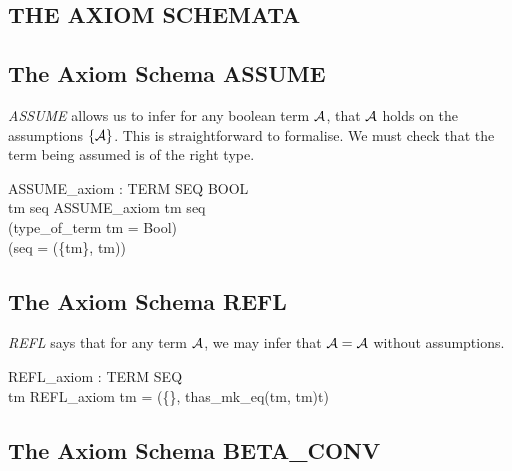 \documentclass[a4paper,11pt,titlepage]{article}
\begin{document}
\begin{titlepage}
\section{THE AXIOM SCHEMATA} \label{AXIOMSCHEMATA}


\subsection{The Axiom Schema ASSUME}

{\it ASSUME} allows us to infer
for any boolean term $\cal A$, that $\cal A$
holds on the assumptions $\{{\cal A}\}$.
This is straightforward to formalise. We must check
that the term being assumed is of the right type.
\begin{HOLConst}
\+	\PrNL{}ASSUME\_axiom\PrNN{} : TERM \MMM{\rightarrow} SEQ \MMM{\rightarrow} BOOL\\
\PrPH{}
\+	\MMM{\forall} tm seq \MMM{\bullet} ASSUME\_axiom tm seq \MMM{\Leftrightarrow}\\
\+	(type\_of\_term tm = Bool) \MMM{\land}\\
\+	(seq = (\{tm\}, tm))\\
\end{HOLConst}

\subsection{The Axiom Schema REFL}
{\it REFL} says that for any term $\cal A$,
we may infer that ${\cal A} = {\cal A}$ without
assumptions.

\begin{HOLConst}
\+	\PrNL{}REFL\_axiom\PrNN{} : TERM \MMM{\rightarrow} SEQ\\
\PrPH{}
\+	\MMM{\forall} tm \MMM{\bullet} REFL\_axiom tm = (\{\}, \MMM{\epsilon}t\MMM{\bullet}has\_mk\_eq(tm, tm)t)\\
\end{HOLConst}

\subsection{The Axiom Schema BETA\_CONV}


\end{titlepage}
\end{document}
